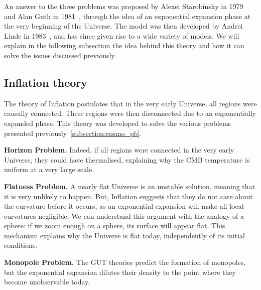 \documentclass[../../thesis.tex]{subfiles}
\begin{document}
An answer to the three problems was proposed by Alexei Starobinsky in 1979~\cite{starobinskii1979} and Alan Guth in 1981~\cite{guth1981}, through the idea of an exponential expansion phase at the very beginning of the Universe. The model was then developed by Andrei Linde in 1983~\cite{linde1983}, and has since given rise to a wide variety of models. We will explain in the following subsection the idea behind this theory and how it can solve the issues discussed previously.

\subsection{Inflation theory}  \label{subsection:inflation}

The theory of Inflation postulates that in the very early Universe, all regions were causally connected. These regions were then disconnected due to an exponentially expanded phase. This theory was developed to solve the various problems presented previously~\ref{subsection:cosmo_pb}. 

\textbf{Horizon Problem.} Indeed, if all regions were connected in the very early Universe, they could have thermalised, explaining why the CMB temperature is uniform at a very large scale. 

\textbf{Flatness Problem.} A nearly flat Universe is an unstable solution, meaning that it is very unlikely to happen. But, Inflation suggests that they do not care about the curvature before it occurs, as an exponential expansion will make all local curvatures negligible. We can understand this argument with the analogy of a sphere: if we zoom enough on a sphere, its surface will appear flat. This mechanism explains why the Universe is flat today, independently of its initial conditions.

\textbf{Monopole Problem.} The GUT theories predict the formation of monopoles, but the exponential expansion dilutes their density to the point where they become unobservable today. 
\end{document}
